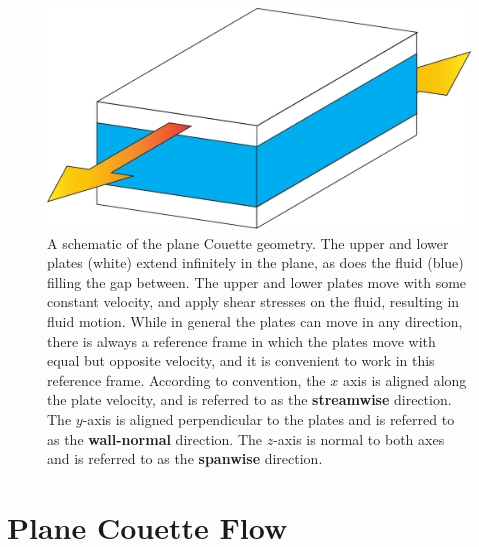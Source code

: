 \begin{figure}
\centerline{
\includegraphics[scale=0.4]{Figs/planeCouetteDiagram}}
\caption{A schematic of the plane Couette geometry. The upper and lower plates (white) extend infinitely in the plane, as does the fluid (blue) filling the gap between. The upper and lower plates move with some constant velocity, and apply shear stresses on the fluid, resulting in fluid motion. While in general the plates can move in any direction, there is always a reference frame in which the plates move with equal but opposite velocity, and it is convenient to work in this reference frame. According to convention, the $x$ axis is aligned along the plate velocity, and is referred to as the {\bf streamwise} direction. The $y$-axis is aligned perpendicular to the plates and is referred to as the {\bf wall-normal} direction. The $z$-axis is normal to both axes and is referred to as the {\bf spanwise} direction.}\label{fig:planeCouette}
\end{figure}

\section{Plane Couette Flow} 

